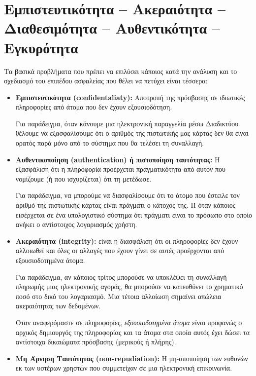 %
%
\section{Εμπιστευτικότητα -- Ακεραιότητα -- Δια\-θε\-σι\-μό\-τη\-τα -- Αυθεντικότητα -- Εγκυρότητα}

Τα βασικά προβλήματα που πρέπει να επιλύσει κάποιος κατά την ανάλυση και το σχεδιασμό του επιπέδου ασφαλείας που θέλει να πετύχει είναι τέσσερα:

\begin{itemize}

\item \textbf{Εμπιστευτικότητα (confidentaliaty):} Αποτροπή της πρόσβασης σε ιδιωτικές πληροφορίες από άτομα που δεν έχουν εξουσιοδότηση.

Για παράδειγμα, όταν κάνουμε μια ηλεκτρονική παραγγελία μέσω Διαδικτύου θέλουμε να εξασφαλίσουμε ότι ο αριθμός της πιστωτικής μας κάρτας δεν θα είναι ορατός παρά μόνο από το σύστημα  που θα τελέσει τη συναλλαγή. 

\item \textbf{Αυθεντικοποίηση (authentication) ή πιστοποίηση ταυτότητας:} Η εξασφάλιση ότι η πληροφορία προέρχεται πραγματικότητα από αυτόν που νομίζουμε (ή που ισχυρίζεται) ότι τη μετέδωσε.

Για παράδειγμα, να μπορούμε να διασφαλίσουμε ότι το άτομο που έστειλε τον αριθμό της πιστωτικής κάρτας είναι πράγματι ο κάτοχος της.  Ή όταν κάποιος εισέρχεται σε ένα υπολογιστικό σύστημα ότι πράγματι είναι το πρόσωπο στο οποίο ανήκει ο αντίστοιχος λογαριασμός χρήστη.

\item \textbf{Ακεραιότητα (integrity):} είναι η διασφάλιση ότι οι πληροφορίες δεν έχουν αλλοιωθεί και όλες οι αλλαγές που έχουν γίνει σε αυτές προέρχονται από εξουσιοδοτημένα άτομα.

Για παράδειγμα, αν κάποιος τρίτος μπορούσε να υποκλέψει τη συναλλαγή πληρωμής μιας ηλεκτρονικής αγοράς, θα μπορούσε να κατευθύνει το χρηματικό ποσό στο δικό του λογαριασμό. Μια τέτοια αλλοίωση σημαίνει απώλεια ακεραιότητας των δεδομένων.

Όταν αναφερόμαστε σε πληροφορίες, \emph{εξουσιοδοτημένα άτομα} είναι προφανώς ο αρχικός δημιουργός της πληροφορίας και τα άτομα στα οποία αυτός έχει δώσει τα αντίστοιχα δικαιώματα πρόσβασης (μερικούς ή πλήρης). 

\item \textbf{Μη Άρνηση Ταυτότητας (non-repudiation):} Η μη-αποποίηση των ευθυνών εκ των υστέρων χρηστών που συμμετείχαν σε μια ηλεκτρονική επικοινωνία.


\end{itemize}
